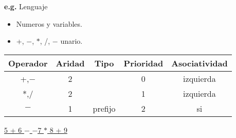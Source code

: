 \documentclass[\main/ApuntesPL.tex]{subfiles}
\begin{document}
      \par
      \textbf{e.g.} Lenguaje\\
      \begin{center}
        \begin{minipage}{.35\textwidth}
          \begin{itemize}
            \item Numeros y variables.
            \item +, $-$, $\ast$, /, $-$ unario.
          \end{itemize}
        \end{minipage}%
        \begin{minipage}{.65\textwidth}
          \begin{tabular}{||c c c c c||}
            \hline
            Operador & Aridad & Tipo & Prioridad & Asociatividad \\ [0.5ex]
            \hline\hline
            +,$-$ & 2 &  & 0 & izquierda \\
            \hline
            *,/ & 2 &  & 1 & izquierda \\
            \hline
            $-$ & 1 & prefijo & 2 & si \\ [1ex]
            \hline
          \end{tabular}
        \end{minipage}
        \begin{minipage}{.5\textwidth}
          \vspace{5mm}
          \underline{\underline{\underline{5 + 6} $-$ \underline{\underline{$-$7} $\ast$ 8}} + 9}
        \end{minipage}
      \end{center}
\end{document}
